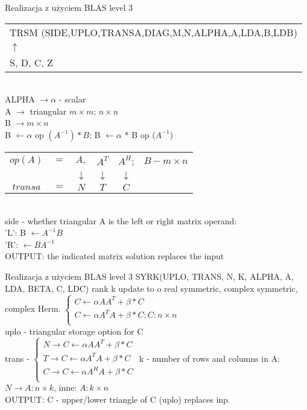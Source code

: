 	\begin{frame}{Realizacja z użyciem BLAS level 3}
		\begin{tabular}{ l }
			\textunderscore TRSM (SIDE,UPLO,TRANSA,DIAG,M,N,ALPHA,A,LDA,B,LDB) \\
		   $\uparrow$ \\
		   S, D, C, Z \\
		\end{tabular} \\ 
		ALPHA $\rightarrow \alpha$ - scalar \\
		A $\rightarrow$ triangular $m \times m$; $n \times n$ \\
		B $\rightarrow m \times n$ \\
		B $\leftarrow \alpha$ op $(A^{-1})*B$; B $\leftarrow \alpha$ * B op ($A^{-1}$)
		\begin{tabular}{ c c c c c c }
			$ op(A) $ & $ = $ & $ A, $ & $ A^T $ & $A^H $; & $ B - m \times n $ \\
			 & & $\downarrow$ & $\downarrow$ & $\downarrow$ & \\
			 $ transa $ & $ = $ & $ N $ & $ T $ & $ C $ & 		
		\end{tabular} \\ 
		side - whether triangular A is the left or right matrix operand: \\
		'L': B $\leftarrow A^{-1}B$ \\
		'R': $\leftarrow BA^{-1}$ \\
		OUTPUT: the indicated matrix solution replaces the input
	\end{frame}
	
	\begin{frame}{Realizacja z użyciem BLAS level 3}
		\textunderscore SYRK(UPLO, TRANS, N, K, ALPHA, A, LDA, BETA, C, LDC)
		rank k update to o real symmetric, complex symmetric, complex Herm.
		$
		\begin{cases}
			C \leftarrow \alpha A A^T + \beta * C \\
			C \leftarrow \alpha A^T A + \beta * C; C: n \times n \\
		\end{cases}
		$ \\
		uplo - triangular storage option for C \\
		trans - $
		\begin{cases}
			N \rightarrow C \leftarrow \alpha A A^T + \beta * C \\
			T \rightarrow C \leftarrow \alpha A^T A + \beta * C \\
			C \rightarrow C \leftarrow \alpha A^H A + \beta * C \\
		\end{cases}$
		k - number of rows and columns in A: $N \rightarrow A: n \times k$, inne: $A: k \times n$ \\
		OUTPUT: C - upper/lower triangle of C (uplo) replaces inp.
	\end{frame}
	
